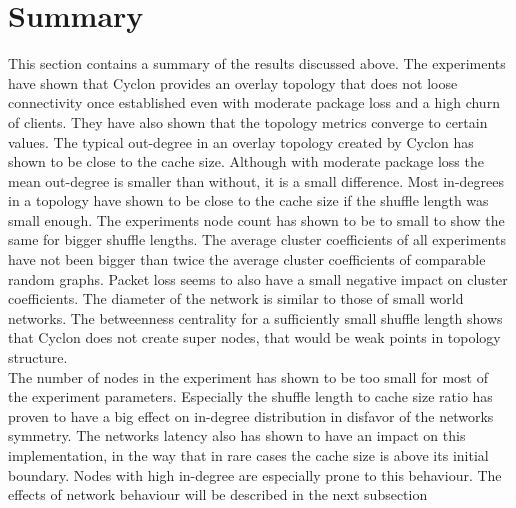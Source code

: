 \FloatBarrier
\section{Summary}
	This section contains a summary of the results discussed above.
	The experiments have shown that Cyclon provides an overlay topology that does
	not loose connectivity once established even with moderate package loss and a
	high churn of clients. They have also shown that the topology metrics converge
	to certain values. The typical out-degree in an overlay topology created by
	Cyclon has shown to be close to the cache size. Although with moderate package
	loss the mean out-degree is smaller than without, it is a small difference.
	Most in-degrees in a topology have shown to be close to the cache size if the
	shuffle length was small enough. The experiments node count has shown to be to
	small to show the same for bigger shuffle lengths. The average cluster
	coefficients of all experiments have not been bigger than twice the average
	cluster coefficients of comparable random graphs. Packet loss seems to also
	have a small negative impact on cluster coefficients. The diameter of the
	network is similar to those of small world networks. The betweenness
	centrality for a sufficiently small shuffle length shows that Cyclon does not
	create super nodes, that would be weak points in topology structure. \\
	
	The number of nodes in the experiment has shown to be too small for most of the
	experiment parameters. Especially the shuffle length to cache size ratio has
	proven to have a big effect on in-degree distribution in disfavor of the
	networks symmetry. The networks latency also has shown to have an impact on
	this implementation, in the way that in rare cases the cache size is above its
	initial boundary. Nodes with high in-degree are especially prone to this
	behaviour. The effects of network behaviour will be described in the next
	subsection
	
	
